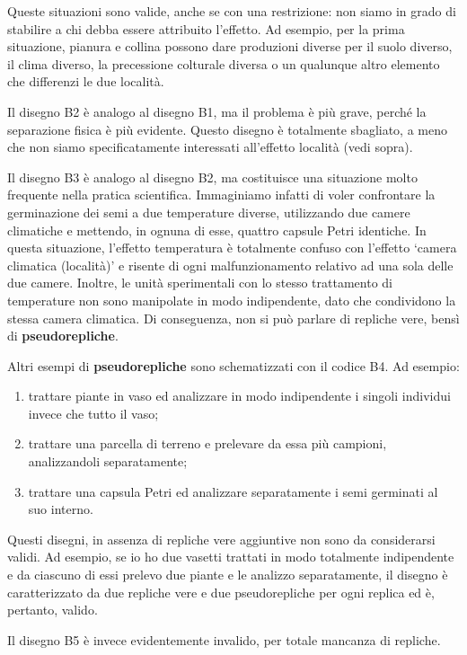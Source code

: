 \documentclass[a4paper,12pt,oneside]{book}
\providecommand{\tightlist}{%
  \setlength{\itemsep}{0pt}\setlength{\parskip}{0pt}}
\begin{document}
Queste situazioni sono valide, anche se con una restrizione: non siamo in grado di stabilire a chi debba essere attribuito l'effetto. Ad esempio, per la prima situazione, pianura e collina possono dare produzioni diverse per il suolo diverso, il clima diverso, la precessione colturale diversa o un qualunque altro elemento che differenzi le due località.

Il disegno B2 è analogo al disegno B1, ma il problema è più grave, perché la separazione fisica è più evidente. Questo disegno è totalmente sbagliato, a meno che non siamo specificatamente interessati all'effetto località (vedi sopra).

Il disegno B3 è analogo al disegno B2, ma costituisce una situazione molto frequente nella pratica scientifica. Immaginiamo infatti di voler confrontare la germinazione dei semi a due temperature diverse, utilizzando due camere climatiche e mettendo, in ognuna di esse, quattro capsule Petri identiche. In questa situazione, l'effetto temperatura è totalmente confuso con l'effetto `camera climatica (località)' e risente di ogni malfunzionamento relativo ad una sola delle due camere. Inoltre, le unità sperimentali con lo stesso trattamento di temperature non sono manipolate in modo indipendente, dato che condividono la stessa camera climatica. Di conseguenza, non si può parlare di repliche vere, bensì di \textbf{pseudorepliche}.

Altri esempi di \textbf{pseudorepliche} sono schematizzati con il codice B4. Ad esempio:

\begin{enumerate}
\def\labelenumi{\arabic{enumi}.}
\tightlist
\item
  trattare piante in vaso ed analizzare in modo indipendente i singoli individui invece che tutto il vaso;
\item
  trattare una parcella di terreno e prelevare da essa più campioni, analizzandoli separatamente;
\item
  trattare una capsula Petri ed analizzare separatamente i semi germinati al suo interno.
\end{enumerate}

Questi disegni, in assenza di repliche vere aggiuntive non sono da considerarsi validi. Ad esempio, se io ho due vasetti trattati in modo totalmente indipendente e da ciascuno di essi prelevo due piante e le analizzo separatamente, il disegno è caratterizzato da due repliche vere e due pseudorepliche per ogni replica ed è, pertanto, valido.

Il disegno B5 è invece evidentemente invalido, per totale mancanza di repliche.
\end{document}
